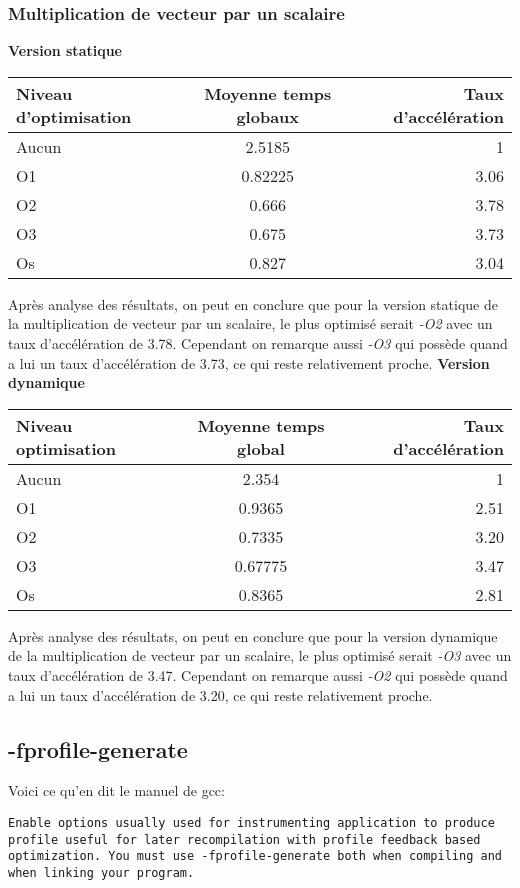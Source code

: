 \documentclass{rapport}
\begin{document}
\subsubsection{Multiplication de vecteur par un scalaire}
\textbf{Version statique}
\begin{center}
\begin{tabular}{ l|c|r }
Niveau d'optimisation & Moyenne temps globaux & Taux d'accélération \\
\hline
Aucun & 2.5185 & 1 \\ 
O1 & 0.82225 & 3.06 \\  
O2 & 0.666 & 3.78 \\  
O3 & 0.675 & 3.73 \\  
Os & 0.827 & 3.04
\end{tabular}
\end{center}
Après analyse des résultats, on peut en conclure que pour la version statique de la multiplication de vecteur par un scalaire, le plus optimisé serait \textit{-O2} avec un taux d'accélération de 3.78.
\newline Cependant on remarque aussi \textit{-O3} qui possède quand a lui un taux d'accélération de 3.73, ce qui reste relativement proche.
\newline\newline
\textbf{Version dynamique}
\begin{center}
\begin{tabular}{ l|c|r }
Niveau optimisation & Moyenne temps global & Taux d'accélération \\
\hline
Aucun & 2.354 & 1 \\ 
O1 & 0.9365 & 2.51 \\  
O2 & 0.7335 & 3.20 \\  
O3 & 0.67775 & 3.47 \\  
Os & 0.8365 & 2.81
\end{tabular}
\end{center}
Après analyse des résultats, on peut en conclure que pour la version dynamique de la multiplication de vecteur par un scalaire, le plus optimisé serait \textit{-O3} avec un taux d'accélération de 3.47.
\newline Cependant on remarque aussi \textit{-O2} qui possède quand a lui un taux d'accélération de 3.20, ce qui reste relativement proche.






\subsection{-fprofile-generate}
Voici ce qu'en dit le manuel de gcc:
\begin{lstlisting}
Enable options usually used for instrumenting application to produce profile useful for later recompilation with profile feedback based optimization. You must use -fprofile-generate both when compiling and when linking your program.
\end{lstlisting}
\end{document}
